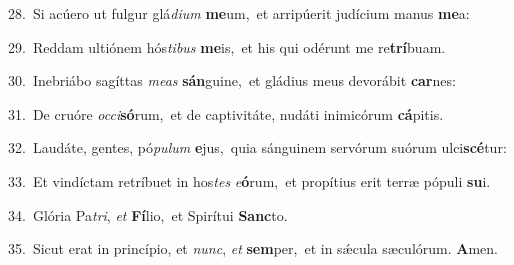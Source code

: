 {\numbfont\textcolor{\numbcolor}{28.}}~Si acúero ut fulgur glá\-\textit{di}\-\textit{um} \textbf{me}\-um,~\star et arripúerit judícium manus \textbf{me}\-a:\par
{\numbfont\textcolor{\numbcolor}{29.}}~Reddam ultiónem hós\-\textit{ti}\-\textit{bus} \textbf{me}\-is,~\star et his qui odérunt me re\-\textbf{trí}\-buam.\par
{\numbfont\textcolor{\numbcolor}{30.}}~Inebriábo sagíttas \textit{me}\-\textit{as} \textbf{sán}\-guine,~\star et gládius meus devorábit \textbf{car}\-nes:\par
{\numbfont\textcolor{\numbcolor}{31.}}~De cruóre \textit{oc}\-\textit{ci}\textbf{só}rum,~\star et de captivitáte, nudáti inimicórum \textbf{cá}\-pitis.\par
{\numbfont\textcolor{\numbcolor}{32.}}~Laudáte, gentes, pó\-\textit{pu}\-\textit{lum} \textbf{e}\-jus,~\star quia sánguinem servórum suórum ulci\-\textbf{scé}\-tur:\par
{\numbfont\textcolor{\numbcolor}{33.}}~Et vindíctam retríbuet in hos\textit{tes} \textit{e}\-\textbf{ó}rum,~\star et propítius erit terræ pópuli \textbf{su}\-i.\par
{\numbfont\textcolor{\numbcolor}{34.}}~Glória Pa\-\textit{tri}\-, \textit{et} \textbf{Fí}\-lio,~\star et Spirítui \textbf{Sanc}\-to.\par
{\numbfont\textcolor{\numbcolor}{35.}}~Sicut erat in princípio, et \textit{nunc}\-, \textit{et} \textbf{sem}\-per,~\star et in sǽcula sæculórum. \textbf{A}\-men.\par
